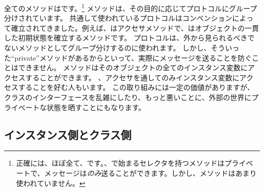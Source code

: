 \documentclass[a4paper,10pt,twoside]{book}
\begin{document}
全てのメソッドはです。\footnote{正確には、ほぼ全て、です。、で始まるセレクタを持つメソッドはプライベートで、メッセージは\emph{のみ}送ることができます。しかし、メソッドはあまり使われていません。}
メソッドは、その目的に応じてプロトコルにグループ分けされています。
共通して使われているプロトコルはコンベンションによって確立されてきました。例えば、はアクセサメソッドで、はオブジェクトの一貫した初期状態を確立するメソッドです。
プロトコルは、外から見られるべきでないメソッドとしてグループ分けするのに使われます。
しかし、そういった``private''メソッドがあるからといって、実際にメッセージを送ることを防ぐことはできません。
メソッドはそのオブジェクトの全てのインスタンス変数にアクセスすることができます。
、アクセサを通してのみインスタンス変数にアクセスすることを好む人もいます。
この取り組みには一定の価値がありますが、クラスのインターフェースを乱雑にしたり、もっと悪いことに、外部の世界にプライベートな状態を晒すことにもなります。

\subsection{インスタンス側とクラス側}
\end{document}
